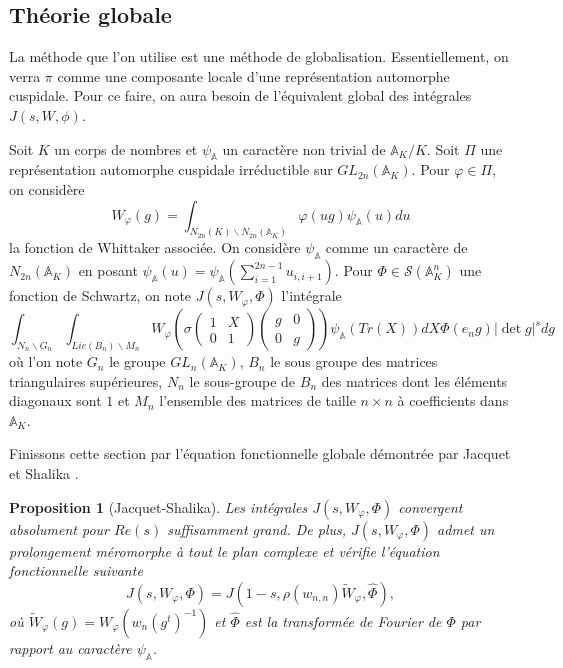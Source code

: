 \documentclass{amsart}
\newtheorem{proposition}{Proposition}[section]
\begin{document}
  \subsection{Théorie globale}
  La méthode que l'on utilise est une méthode de globalisation. Essentiellement, on verra $\pi$ comme une composante locale d'une représentation automorphe cuspidale. Pour ce faire, on aura besoin de l'équivalent global des intégrales $J(s, W, \phi)$.
  
  Soit $K$ un corps de nombres et $\psi_\mathbb{A}$ un caractère non trivial de $\mathbb{A}_K/K$. Soit $\Pi$ une représentation automorphe cuspidale irréductible sur $GL_{2n}(\mathbb{A}_K)$. Pour $\varphi \in \Pi$, on considère
  \begin{equation}
  W_\varphi(g) = \int_{N_{2n}(K)\backslash{N_{2n}(\mathbb{A}_K)}} \varphi(ug)\psi_\mathbb{A}(u)du
  \end{equation}
  la fonction de Whittaker associée. On considère $\psi_\mathbb{A}$ comme un caractère de $N_{2n}(\mathbb{A}_K)$ en posant $\psi_\mathbb{A}(u) = \psi_\mathbb{A}(\sum_{i=1}^{2n-1} u_{i,i+1})$. Pour $\Phi \in \mathcal{S}(\mathbb{A}_K^n)$ une fonction de Schwartz, on note $J(s, W_\varphi, \Phi)$ l'intégrale
  \begin{equation}
\int_{N_n\backslash{G_n}} \int_{Lie(B_n)\backslash{M_n}} W_\varphi \left(\sigma \begin{pmatrix}
1 & X \\
0 & 1
\end{pmatrix}\begin{pmatrix}
g & 0 \\
0 & g
\end{pmatrix}\right)\psi_\mathbb{A}(Tr(X))dX\Phi(e_ng)|\det g|^s dg
 \end{equation}
 où l'on note $G_n$ le groupe $GL_n(\mathbb{A}_K)$, $B_n$ le sous groupe des matrices triangulaires supérieures, $N_n$ le sous-groupe de $B_n$ des matrices dont les éléments diagonaux sont $1$ et $M_n$ l'ensemble des matrices de taille $n \times n$ à coefficients dans $\mathbb{A}_K$.
 
  Finissons cette section par l'équation fonctionnelle globale démontrée par Jacquet et Shalika \cite{jacquet-shalika}.
 \begin{proposition}[Jacquet-Shalika]
 \label{funcglob}
 Les intégrales $J(s, W_\varphi, \Phi)$ convergent absolument pour $Re(s)$ suffisamment grand. De plus, $J(s, W_\varphi, \Phi)$ admet un prolongement méromorphe à tout le plan complexe et vérifie l'équation fonctionnelle suivante
 \begin{equation}
 J(s,W_\varphi,\Phi)=J(1-s, \rho(w_{n,n})\tilde{W}_\varphi, \hat{\Phi}),
 \end{equation}
 où $\tilde{W}_\varphi(g) = W_\varphi(w_n(g^t)^{-1})$ et $\hat{\Phi}$ est la transformée de Fourier de $\Phi$ par rapport au caractère $\psi_\mathbb{A}$.
 \end{proposition}
 
\end{document}
